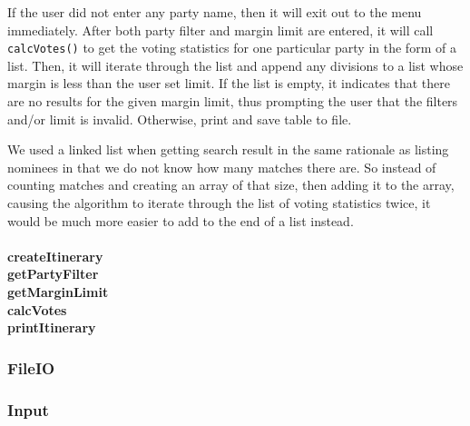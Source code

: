 \documentclass[a4paper, 12pt, titlepage]{article}
\newcommand{\code}[1]{\small\texttt{#1}\normalsize}
\begin{document}
If the user did not enter any party name, then it will exit out to the menu
immediately. After both party filter and margin limit are entered, it will
call \code{calcVotes()} to get the voting statistics for one particular party
in the form of a list. Then, it will iterate through the list and append
any divisions to a list whose margin is less than the user set limit. If
the list is empty, it indicates that there are no results for the given
margin limit, thus prompting the user that the filters and/or limit is
invalid. Otherwise, print and save table to file.

We used a linked list when getting search result in the same rationale as
listing nominees in that we do not know how many matches there are. So instead
of counting matches and creating an array of that size, then adding it to
the array, causing the algorithm to iterate through the list of voting
statistics twice, it would be much more easier to add to the end of a list
instead.

\paragraph{createItinerary \\
           getPartyFilter \\
           getMarginLimit \\
           calcVotes \\
           printItinerary
} \hspace{0pt}



\subsubsection{FileIO}



\subsubsection{Input}
\end{document}
